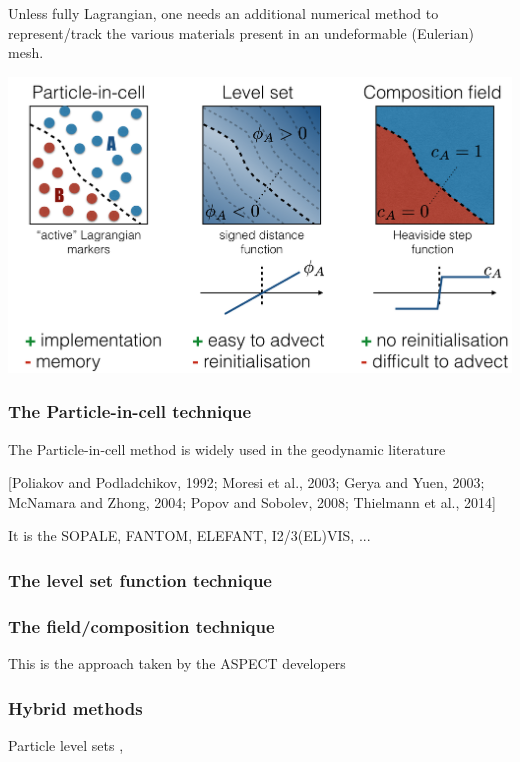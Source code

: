 
Unless fully Lagrangian, one needs an additional numerical method to represent/track
the various materials present in an undeformable (Eulerian) mesh.


\begin{center}
\includegraphics[width=15cm]{images/tracking}
\end{center}

\subsubsection{The Particle-in-cell technique}

\cite{galh19}

The Particle-in-cell method is widely used in the geodynamic literature \cite[e.g.][]{popo92}

 [Poliakov and Podladchikov, 1992; Moresi et al., 2003; Gerya and Yuen, 2003; McNamara and
Zhong, 2004; Popov and Sobolev, 2008; Thielmann et al., 2014]

It is the SOPALE, FANTOM, ELEFANT, I2/3(EL)VIS, ...

\subsubsection{The level set function technique}


\subsubsection{The field/composition technique}

This is the approach taken by the ASPECT developers \cite{krhb12,hedg17}


\subsubsection{Hybrid methods}

Particle level sets \cite{brtf08}, \cite{saev10}



